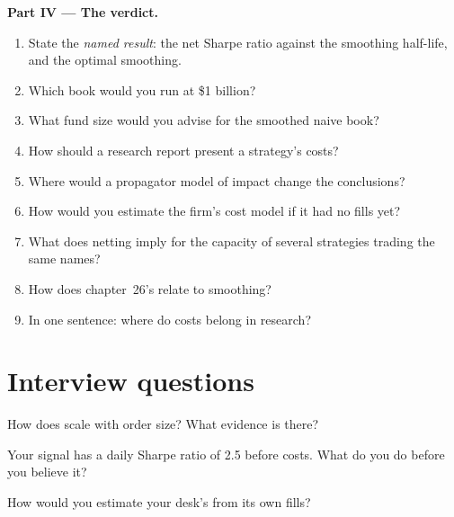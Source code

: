 \begin{problem}
\medskip\noindent\textbf{Part IV --- The verdict.}
\begin{enumerate}[resume]
\item State the \emph{named result}: the net Sharpe ratio against the smoothing half-life, and the optimal smoothing.
\item Which book would you run at \$1 billion?
\item What fund size would you advise for the smoothed naive book?
\item How should a research report present a strategy's costs?
\item Where would a propagator model of impact change the conclusions?
\item How would you estimate the firm's cost model if it had no fills yet?
\item What does netting imply for the capacity of several strategies trading the same names?
\item How does chapter~26's  relate to smoothing?
\item In one sentence: where do costs belong in research?
\end{enumerate}
\end{problem}

\section{Interview questions}

\begin{interviewq}\label{iq:rs:transaction-costs-in-research:1}
How does  scale with order size? What evidence is there?
\end{interviewq}

\begin{interviewq}\label{iq:rs:transaction-costs-in-research:2}
Your signal has a daily Sharpe ratio of 2.5 before costs. What do you do before you believe it?
\end{interviewq}

\begin{interviewq}\label{iq:rs:transaction-costs-in-research:3}
How would you estimate your desk's  from its own fills?
\end{interviewq}

